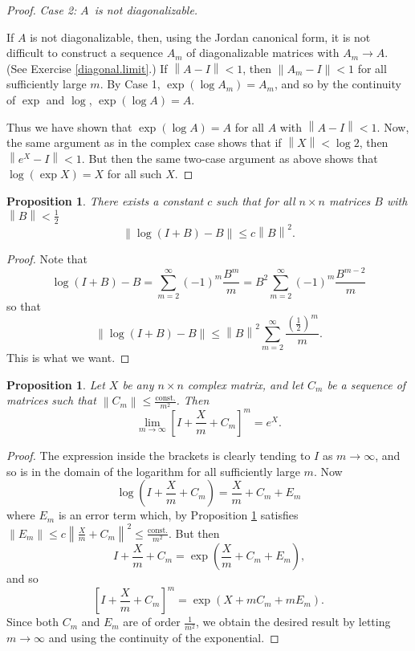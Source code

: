 \documentclass{amsbook}
\theoremstyle{plain}
\newtheorem{proposition}[theorem]{Proposition}
\numberwithin{equation}{chapter}
\numberwithin{theorem}{chapter}
\begin{document}
\begin{proof}
\textit{Case 2: }$A$\textit{\ is not diagonalizable.}

If $A$ is not diagonalizable, then, using the Jordan canonical form, it is not
difficult to construct a sequence $A_{m}$ of diagonalizable matrices with
$A_{m}\rightarrow A$. (See Exercise \ref{diagonal.limit}.) If $\left\|
A-I\right\|  <1$, then $\left\|  A_{m}-I\right\|  <1$ for all sufficiently
large $m$. By Case 1, $\exp(\log A_{m})=A_{m}$, and so by the continuity of
$\exp$ and $\log$, $\exp(\log A)=A$.

Thus we have shown that $\exp(\log A)=A$ for all $A$ with $\left\|
A-I\right\|  <1$. Now, the same argument as in the complex case shows that if
$\left\|  X\right\|  <\log2$, then $\left\|  e^{X}-I\right\|  <1$. But then
the same two-case argument as above shows that $\log(\exp X)=X$ for all such
$X$.
\end{proof}

\begin{proposition}
\label{log.estimate}There exists a constant $c$ such that for all $n\times n$
matrices $B$ with $\left\|  B\right\|  <\tfrac{1}{2}$%
\[
\left\|  \log(I+B)-B\right\|  \leq c\left\|  B\right\|  ^{2}\text{.}%
\]
\end{proposition}

\begin{proof}
Note that
\[
\log(I+B)-B=\sum_{m=2}^{\infty}(-1)^{m}\frac{B_{{}}^{m}}{m}=B^{2}\sum
_{m=2}^{\infty}(-1)^{m}\frac{B_{{}}^{m-2}}{m}%
\]
so that
\[
\left\|  \log(I+B)-B\right\|  \leq\left\|  B\right\|  ^{2}\sum_{m=2}^{\infty
}\frac{\left(  \tfrac{1}{2}\right)  ^{m}}{m}\text{.}%
\]
This is what we want.
\end{proof}

\begin{proposition}
\label{limit}Let $X$ be any $n\times n$ complex matrix, and let $C_{m}$ be a
sequence of matrices such that $\left\|  C_{m}\right\|  \leq\tfrac
{\mathrm{const.}}{m^{2}}$. Then
\[
\lim_{m\rightarrow\infty}\left[  I+\frac{X}{m}+C_{m}\right]  ^{m}%
=e^{X}\text{.}%
\]
\end{proposition}

\begin{proof}
The expression inside the brackets is clearly tending to $I$ as $m\rightarrow
\infty$, and so is in the domain of the logarithm for all sufficiently large
$m$. Now
\[
\log\left(  I+\frac{X}{m}+C_{m}\right)  =\frac{X}{m}+C_{m}+E_{m}%
\]
where $E_{m}$ is an error term which, by Proposition \ref{log.estimate}
satisfies $\left\|  E_{m}\right\|  \leq c\left\|  \frac{X}{m}+C_{m}\right\|
^{2}\leq\frac{\mathrm{const.}}{m^{2}}$. But then
\[
I+\frac{X}{m}+C_{m}=\exp\left(  \frac{X}{m}+C_{m}+E_{m}\right)  \text{,}%
\]
and so
\[
\left[  I+\frac{X}{m}+C_{m}\right]  ^{m}=\exp\left(  X+mC_{m}+mE_{m}\right)
\text{.}%
\]
Since both $C_{m}$ and $E_{m}$ are of order $\tfrac{1}{m^{2}}$, we obtain the
desired result by letting $m\rightarrow\infty$ and using the continuity of the exponential.
\end{proof}
\end{document}
